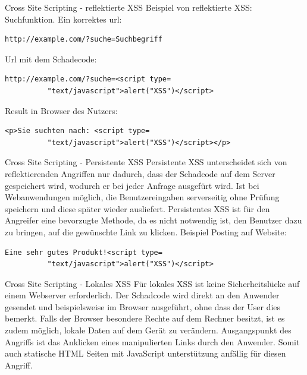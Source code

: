 \documentclass[10pt]{beamer}
\begin{document}
\begin{frame}[fragile]{Cross Site Scripting - reflektierte XSS}
  Beispiel von reflektierte XSS: Suchfunktion.
  \newline
  Ein korrektes url:
  \begin{lstlisting}[style=CStyle]
    http://example.com/?suche=Suchbegriff
  \end{lstlisting}
  Url mit dem Schadecode:
  \begin{lstlisting}[style=CStyle]
    http://example.com/?suche=<script type=
          "text/javascript">alert("XSS")</script>
  \end{lstlisting}
  Result in Browser des Nutzers:
  \begin{lstlisting}[style=CStyle]
    <p>Sie suchten nach: <script type=
          "text/javascript">alert("XSS")</script></p>
  \end{lstlisting}
\end{frame}

\begin{frame}[fragile]{Cross Site Scripting - Persistente XSS}
  Persistente XSS unterscheidet sich von reflektierenden Angriffen nur dadurch, dass der Schadcode auf dem Server gespeichert wird, wodurch er bei jeder Anfrage ausgef\"urt wird.
  Ist bei Webanwendungen m\"oglich, die Benutzereingaben serverseitig ohne Pr\"ufung speichern und diese sp\"ater wieder ausliefert. Persistentes XSS ist für den Angreifer eine bevorzugte Methode, da es nicht notwendig ist, den Benutzer dazu zu bringen, auf die gew\"unschte Link zu klicken.
  \newline
  Beispiel Posting auf Website:
  \begin{lstlisting}[style=CStyle]
    Eine sehr gutes Produkt!<script type=
          "text/javascript">alert("XSS")</script>
  \end{lstlisting}
\end{frame}

\begin{frame}[fragile]{Cross Site Scripting - Lokales XSS}
  F\"ur lokales XSS ist keine Sicherheitsl\"ucke auf einem Webserver erforderlich. Der Schadcode wird direkt an den Anwender gesendet und beispielsweise im Browser ausgeführt, ohne dass der User dies bemerkt.
  \newline
  Falls der Browser besondere Rechte auf dem Rechner besitzt, ist es zudem möglich, lokale Daten auf dem Gerät zu verändern.
  \newline
  Ausgangspunkt des Angriffs ist das Anklicken eines manipulierten Links durch den Anwender.
  Somit auch statische HTML Seiten mit JavaScript unterst\"utzung anf\"allig f\"ur diesen Angriff.
\end{frame}
\end{document}
